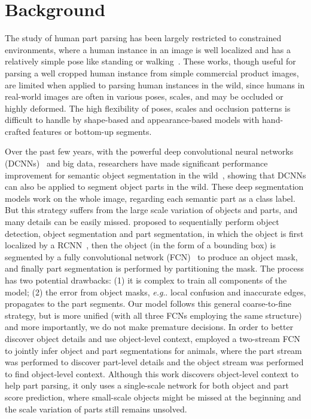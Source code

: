 \documentclass[runningheads]{llncs}
\makeatletter
\DeclareRobustCommand\onedot{\futurelet\@let@token\@onedot}
\def\@onedot{\ifx\@let@token.\else.\null\fi\xspace}
\def\eg{\emph{e.g}\onedot} \def\Eg{\emph{E.g}\onedot}
\makeatother
\begin{document}
\section{Background}
The study of human part parsing has been largely restricted to constrained environments, where a human instance in an image is well localized and has a relatively simple pose like standing or walking~\cite{bo2011shape,zhu2011max,eslami2012generative,yamaguchi2012parsing,dong2014towards,LiuCVPR15,DBLP:journals/corr/XiaZWY15}.
These works, though useful for parsing a well cropped human instance from simple commercial product images, are limited when applied to parsing human instances in the wild, since humans in real-world images are often in various poses, scales, and may be occluded or highly deformed. The high flexibility of poses, scales and occlusion patterns is difficult to handle by shape-based and appearance-based models with hand-crafted features or bottom-up segments.

Over the past few years, with the powerful deep convolutional neural networks (DCNNs)~\cite{lecun1998gradient} and big data, researchers have made significant performance improvement for semantic object segmentation in the wild~\cite{chen2014semantic,dai2015boxsup,liu2015semantic,noh2015learning,papandreou2015weakly,wang2015towards,tsogkas2015semantic}, showing that DCNNs can also be applied to segment object parts in the wild. These deep segmentation models work on the whole image, regarding each semantic part as a class label. But this strategy suffers from the large scale variation of objects and parts, and many details can be easily missed.
\cite{hariharan2014hypercolumns} proposed to sequentially perform object detection, object segmentation and part segmentation, in which the object is first localized by a RCNN~\cite{girshick2014rich}, then the object (in the form of a bounding box) is segmented by a fully convolutional network (FCN)~\cite{long2014fully} to produce an object mask, and finally part segmentation is performed by partitioning the mask.
The process has two potential drawbacks: (1) it is complex to train all components of the model; (2) the error from object masks, \eg local confusion and inaccurate edges, propagates to the part segments. Our model follows this general coarse-to-fine strategy, but is more unified (with all three FCNs employing the same structure) and more importantly, we do not make premature decisions.
In order to better discover object details and use object-level context, \cite{wang2015joint} employed a two-stream FCN to jointly infer object and part segmentations for animals, where the part stream was performed to discover part-level details and the object stream was performed to find object-level context. Although this work discovers object-level context to help part parsing, it only uses a single-scale network for both object and part score prediction, where small-scale objects might be missed at the beginning and the scale variation of parts still remains unsolved.
\end{document}
